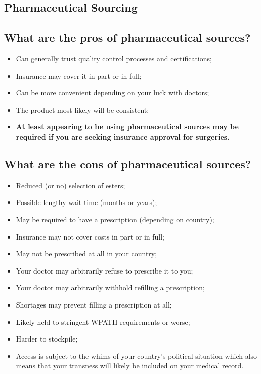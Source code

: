 \documentclass{article}
\begin{document}
\subsection*{Pharmaceutical Sourcing}

\subsection{What are the pros of pharmaceutical sources?}

\begin{itemize}
  \item Can generally trust quality control processes and certifications;
  \item Insurance may cover it in part or in full;
  \item Can be more convenient depending on your luck with doctors;
  \item The product most likely will be consistent;
  \item \textbf{At least appearing to be using pharmaceutical sources may be required if you are seeking insurance approval for surgeries.}
\end{itemize}

\subsection{What are the cons of pharmaceutical sources?}

\begin{itemize}
  \item Reduced (or no) selection of esters;
  \item Possible lengthy wait time (months or years);
  \item May be required to have a prescription (depending on country);
  \item Insurance may not cover costs in part or in full;
  \item May not be prescribed at all in your country;
  \item Your doctor may arbitrarily refuse to prescribe it to you;
  \item Your doctor may arbitrarily withhold refilling a prescription;
  \item Shortages may prevent filling a prescription at all;
  \item Likely held to stringent WPATH requirements or worse;
  \item Harder to stockpile;
  \item Access is subject to the whims of your country’s political situation which also means that your transness will likely be included on your medical record. 
\end{itemize}
\end{document}
